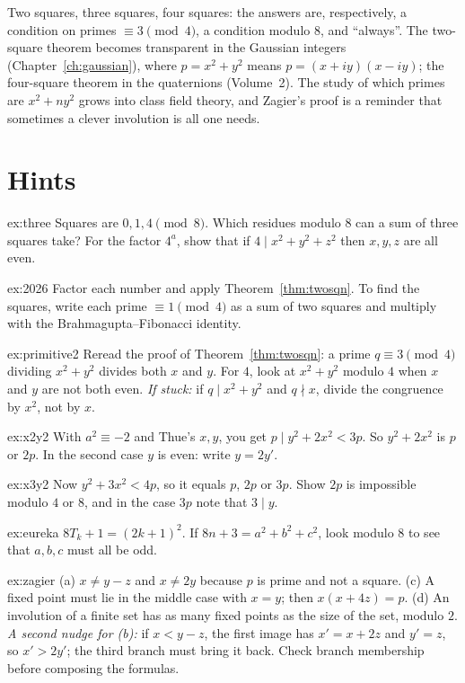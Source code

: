 \begin{beauty}
Two squares, three squares, four squares: the answers are, respectively, a condition on primes $\equiv3\pmod4$, a condition modulo $8$, and ``always''. The two-square theorem becomes transparent in the Gaussian integers (Chapter~\ref{ch:gaussian}), where $p=x^2+y^2$ means $p=(x+iy)(x-iy)$; the four-square theorem in the quaternions (Volume~2). The study of which primes are $x^2+ny^2$ grows into class field theory, and Zagier's proof is a reminder that sometimes a clever involution is all one needs.
\end{beauty}

\section{Hints}

\begin{hint}{ex:three}
Squares are $0,1,4\pmod8$. Which residues modulo $8$ can a sum of three squares take? For the factor $4^a$, show that if $4\mid x^2+y^2+z^2$ then $x,y,z$ are all even.
\end{hint}
\begin{hint}{ex:2026}
Factor each number and apply Theorem~\ref{thm:twosqn}. To find the squares, write each prime $\equiv1\pmod4$ as a sum of two squares and multiply with the Brahmagupta--Fibonacci identity.
\end{hint}
\begin{hint}{ex:primitive2}
Reread the proof of Theorem~\ref{thm:twosqn}: a prime $q\equiv3\pmod4$ dividing $x^2+y^2$ divides both $x$ and $y$. For $4$, look at $x^2+y^2$ modulo $4$ when $x$ and $y$ are not both even. \emph{If stuck:} if $q\mid x^2+y^2$ and $q\nmid x$, divide the congruence by $x^2$, not by $x$.
\end{hint}
\begin{hint}{ex:x2y2}
With $a^2\equiv-2$ and Thue's $x,y$, you get $p\mid y^2+2x^2<3p$. So $y^2+2x^2$ is $p$ or $2p$. In the second case $y$ is even: write $y=2y'$.
\end{hint}
\begin{hint}{ex:x3y2}
Now $y^2+3x^2<4p$, so it equals $p$, $2p$ or $3p$. Show $2p$ is impossible modulo $4$ or $8$, and in the case $3p$ note that $3\mid y$.
\end{hint}
\begin{hint}{ex:eureka}
$8T_k+1=(2k+1)^2$. If $8n+3=a^2+b^2+c^2$, look modulo $8$ to see that $a,b,c$ must all be odd.
\end{hint}
\begin{hint}{ex:zagier}
(a) $x\ne y-z$ and $x\ne2y$ because $p$ is prime and not a square. (c) A fixed point must lie in the middle case with $x=y$; then $x(x+4z)=p$. (d) An involution of a finite set has as many fixed points as the size of the set, modulo $2$. \emph{A second nudge for (b):} if $x<y-z$, the first image has $x'=x+2z$ and $y'=z$, so $x'>2y'$; the third branch must bring it back. Check branch membership before composing the formulas.
\end{hint}

